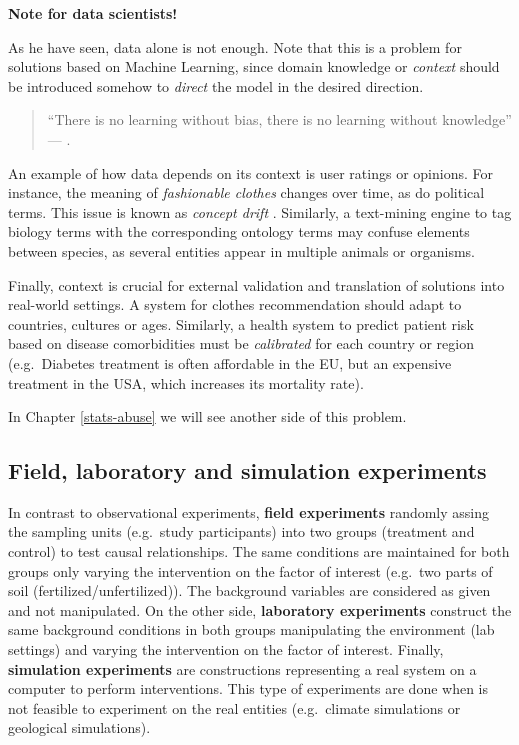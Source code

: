\documentclass[
]{book}
\begin{document}
\begin{tipbox}

\textbf{Note for data scientists!}

As he have seen, data alone is not enough. Note that this is a problem for solutions based on Machine Learning, since domain knowledge or \emph{context} should be introduced somehow to \emph{direct} the model in the desired direction.

\begin{quote}
``There is no learning without bias, there is no learning without knowledge'' --- \citep{skansi2020guide} \citep{domingos2015master}.
\end{quote}

An example of how data depends on its context is user ratings or opinions. For instance, the meaning of \emph{fashionable clothes} changes over time, as do political terms. This issue is known as \emph{concept drift} \citep{kubat2017introduction}. Similarly, a text-mining engine to tag biology terms with the corresponding ontology terms may confuse elements between species, as several entities appear in multiple animals or organisms.

Finally, context is crucial for external validation and translation of solutions into real-world settings. A system for clothes recommendation should adapt to countries, cultures or ages. Similarly, a health system to predict patient risk based on disease comorbidities must be \emph{calibrated} for each country or region (e.g.~Diabetes treatment is often affordable in the EU, but an expensive treatment in the USA, which increases its mortality rate).

In Chapter \ref{stats-abuse} we will see another side of this problem.

\end{tipbox}

\hypertarget{field-laboratory-and-simulation-experiments}{%
\subsection{Field, laboratory and simulation experiments}\label{field-laboratory-and-simulation-experiments}}

In contrast to observational experiments, \textbf{field experiments} randomly assing the sampling units (e.g.~study participants) into two groups (treatment and control) to test causal relationships. The same conditions are maintained for both groups only varying the intervention on the factor of interest (e.g.~two parts of soil (fertilized/unfertilized)). The background variables are considered as given and not manipulated. On the other side, \textbf{laboratory experiments} construct the same background conditions in both groups manipulating the environment (lab settings) and varying the intervention on the factor of interest. Finally, \textbf{simulation experiments} are constructions representing a real system on a computer to perform interventions. This type of experiments are done when is not feasible to experiment on the real entities (e.g.~climate simulations or geological simulations).
\end{document}
